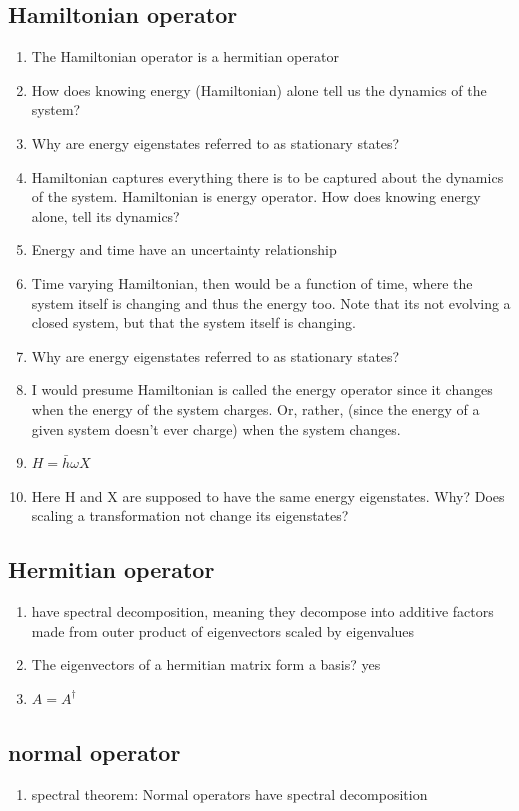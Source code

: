 \documentclass[a4paper,12pt]{amsbook}
\newcommand{\0}{{$|0\rangle$}}
\newcommand{\1}{{$|1\rangle$}}
\begin{document}
\subsection{Hamiltonian operator}
\begin{enumerate}
    \item The Hamiltonian operator is a hermitian operator
    \item How does knowing energy (Hamiltonian) alone tell us the dynamics of the system? 
    \item Why are energy eigenstates referred to as stationary states? 
    \item Hamiltonian captures everything there is to be captured about the dynamics of the system. Hamiltonian is energy operator. How does knowing energy alone, tell its dynamics?
    \item Energy and time have an uncertainty relationship
    \item Time varying Hamiltonian, then would be a function of time, where the system itself is changing and thus the energy too. Note that its not evolving a closed system, but that the system itself is changing.
    \item Why are energy eigenstates referred to as stationary states?
    \item I would presume Hamiltonian is called the energy operator since it changes when the energy of the system charges. Or, rather, (since the energy of a given system doesn't ever charge) when the system changes.
    \item $H = \bar{h}\omega X$
    \item Here H and X are supposed to have the same energy eigenstates. Why? Does scaling a transformation not change its eigenstates?
\end{enumerate}

\subsection{Hermitian operator}
\begin{enumerate}
    \item have spectral decomposition, meaning they decompose into additive factors made from outer product of eigenvectors scaled by eigenvalues 
    \item The eigenvectors of a hermitian matrix form a basis? yes 
    \item $A = A^\dagger$
\end{enumerate}
\subsection{normal operator}
    \begin{enumerate}
        \item spectral theorem: Normal operators have spectral decomposition
    \end{enumerate}
\end{document}
